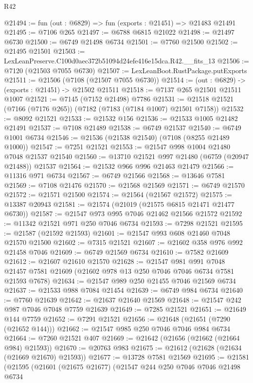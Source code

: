 \begin{lexlean}{R42}
\begin{coremodule}
{@21494 := fun (out : @6829) => fun (exports : @21451) => @21483 @21491
@21495 := @7106 @265
@21497 := @6788 @6815 @21022
@21498 := @21497 @6730
@21500 := @6749 @21498 @6734
@21501 := @7760 @21500
@21502 := @21495 @21501
@21503 := LexLeanPreserve.C100d0aec372b51094d24efe416e15dca.R42.__fits_13
@21506 := @7120 (@21503 @7055 @6730)
@21507 := LexLeanBoot.RustPackage.putExports
@21511 := @21506 (@7108 (@21507 @7055 @6730))
@21514 := (out : @6829) -> (exports : @21451) -> @21502 @21511
@21518 := @7137 @265 @21501 @21511 @1007
@21521 := @7145 (@7152 @21498) @7786
@21531 := @21518 @21521 (@7166 (@7176 @265)) (@7182 (@7183 (@7184 @1007) @21501 @7158))
@21532 := @8092 @21521
@21533 := @21532 @156
@21536 := @21533 @1005 @21482 @21491
@21537 := @7108 @21489
@21538 := @6749 @21537
@21540 := @6749 @1001 @6734
@21546 := @21536 (@21538 @21540) (@7108 (@8255 @21489 @1000))
@21547 := @7251 @21521
@21553 := @21547 @998 @1004 @21480 @7048 @21537 @21540
@21560 := @13710 @21521 @997 @21480 (@6759 (@20947 @21488)) @21537
@21564 := @21532 @966 @996 @21463 @21479
@21566 := @11316 @971 @6734
@21567 := @6749 @21566
@21568 := @13646 @7581
@21569 := @7108 @21476
@21570 := @21568 @21569
@21571 := @6749 @21570
@21572 := @21571 @21500
@21574 := @21564 (@21567 @21572)
@21575 := @13387 @20943
@21581 := @21574 (@21019 (@21575 @6815 @21471 @21477 @6730))
@21587 := @21547 @973 @995 @7046 @21462 @21566 @21572
@21592 := @11342 @21521 @971 @250 @7046 @6734
@21593 := @7298 @21521
@21595 := @21587 (@21592 @21593)
@21601 := @21547 @993 @608 @21460 @7048 @21570 @21500
@21602 := @7315 @21521
@21607 := @21602 @358 @976 @992 @21458 @7046
@21609 := @6749 @21569 @6734
@21610 := @7582 @21609
@21612 := @21607 @21610 @21570
@21628 := @21547
    @981
    @991
    @7048
    @21457
    @7581
    @21609
    (@21602 @978 @13 @250 @7046 @7046 @6734 @7581 @21593 @7678)
@21634 := @21547 @989 @250 @21455 @7046 @21569 @6734
@21637 := @21533 @988 @7084 @21454
@21639 := @6749 @984 @6734
@21640 := @7760 @21639
@21642 := @21637 @21640 @21569
@21648 := @21547 @242 @987 @7046 @7048 @7759 @21639
@21649 := @7285 @21521
@21651 := @21649 @144 @7759
@21652 := @7291 @21521
@21656 := @21648 (@21651 (@7290 (@21652 @144)))
@21662 := @21547 @985 @250 @7046 @7046 @984 @6734
@21664 := @7260 @21521 @407
@21669 := @21642 (@21656 (@21662 (@21664 @984) @21593))
@21670 := @20763 @983
@21675 := @21612 (@21628 (@21634 (@21669 @21670) @21593))
@21677 := @13728 @7581 @21569
@21695 := @21581
    (@21595
      (@21601
        (@21675 @21677)
        (@21547
          @244
          @250
          @7046
          @7046
          @21498
          @6734
}
\end{coremodule}
\end{lexlean}
